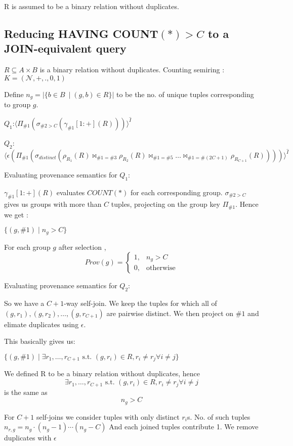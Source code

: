 \documentclass[10pt,a4paper]{scrartcl}
\theoremstyle{definition}
\theoremstyle{remark}
\begin{document}
R is assumed to be a binary relation without duplicates.


\subsection{Reducing HAVING COUNT$(*) > C$ to a JOIN-equivalent query}

$R \subseteq  A \times B$ is a binary relation without duplicates.
Counting semiring : $K = (\mathcal{N}, +, ., 0, 1)$

Define $n_g = |\{b \in B\ \mid (g,b) \in R\}|$ to be the no. of unique tuples corresponding to group $g$.

$Q_1$:$\langle\Pi_{\#1}(\sigma_{\#2>C}(\gamma_{\#1}[1:+](R)))\rangle^{\hat I}$

$Q_2$: $\langle \epsilon(\Pi_{\#1}(\sigma_{distinct}(\rho_{R_1}(R)\bowtie_{\#1=\#3} \rho_{R_2}(R)\bowtie_{\#1=\#5}\dots\bowtie_{\#1=\#(2C+1)}\rho_{R_{C+1}}(R))))\rangle^{\hat I}$

Evaluating provenance semantics for $Q_1$:

$\gamma_{\#1}[1:+](R)$ evaluates $COUNT(*)$ for each corresponding group. $\sigma_{\#2>C}$ gives us groups with more than $C$ tuples, projecting on the group key $\Pi_{\#1}$.
Hence we get :

$\{ (g,\#1) \mid n_g > C \}$

For each group $g$ after selection ,
$$Prov(g) = \begin{cases}
   1, & n_g > C \\
   0, & \text{otherwise}
   \end{cases}$$

Evaluating provenance semantics for $Q_2$:

So we have a $C+1$-way self-join.
We keep the tuples for which  all of $(g,r_1),(g,r_2),\dots,(g,r_{C+1})$ are pairwise distinct. We then project on $\#1$ and elimate duplicates using $\epsilon$.

This basically gives us:

$\{(g,\#1) \mid \exists r_1,\dots,r_{C+1} \text{  s.t. } (g,r_i) \in R, r_i\neq r_j \forall i \neq j  \}$

We defined R to be a binary relation without duplicates, hence $$\exists r_1,\dots,r_{C+1} \text{  s.t. } (g,r_i) \in R, r_i\neq r_j \forall i \neq j $$ is the same as $$n_g>C$$


For $C+1$ self-joins we consider tuples with only distinct $r_i$s.
No. of such tuples $n_{r, g}= n_g \cdot (n_g-1) \cdots (n_g - C)$
And each joined tuples contribute 1. 
We remove duplicates with $\epsilon$
\end{document}
